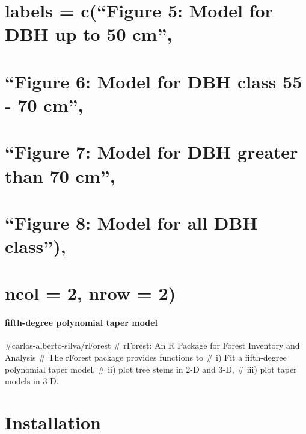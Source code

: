 \documentclass[
]{article}
\begin{document}
\hypertarget{labels-cfigure-5-model-for-dbh-up-to-50-cm}{%
\section{labels = c(``Figure 5: Model for DBH up to 50
cm'',}\label{labels-cfigure-5-model-for-dbh-up-to-50-cm}}

\hypertarget{figure-6-model-for-dbh-class-55---70-cm}{%
\section{``Figure 6: Model for DBH class 55 - 70
cm'',}\label{figure-6-model-for-dbh-class-55---70-cm}}

\hypertarget{figure-7-model-for-dbh-greater-than-70-cm}{%
\section{``Figure 7: Model for DBH greater than 70
cm'',}\label{figure-7-model-for-dbh-greater-than-70-cm}}

\hypertarget{figure-8-model-for-all-dbh-class}{%
\section{``Figure 8: Model for all DBH
class''),}\label{figure-8-model-for-all-dbh-class}}

\hypertarget{ncol-2-nrow-2}{%
\section{ncol = 2, nrow = 2)}\label{ncol-2-nrow-2}}

\hypertarget{fifth-degree-polynomial-taper-model}{%
\paragraph{fifth-degree polynomial taper
model}\label{fifth-degree-polynomial-taper-model}}

\#carlos-alberto-silva/rForest \# rForest: An R Package for Forest
Inventory and Analysis \# The rForest package provides functions to \#
i) Fit a fifth-degree polynomial taper model, \# ii) plot tree stems in
2-D and 3-D, \# iii) plot taper models in 3-D.

\hypertarget{installation}{%
\section{Installation}\label{installation}}
\end{document}
